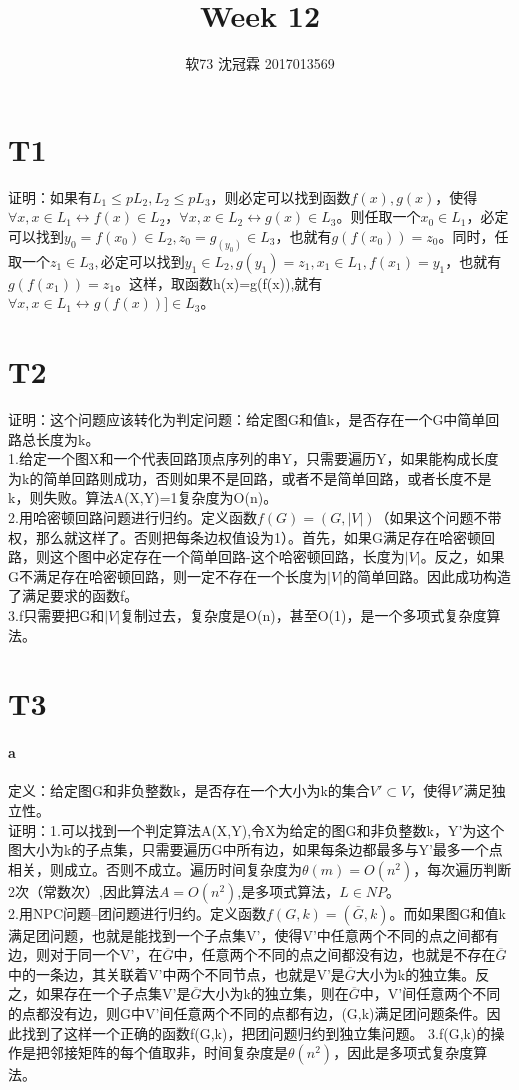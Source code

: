 \documentclass{article}
\title{Week 12}
\author{软73 沈冠霖 2017013569}
\begin{document}
\begin{CJK}{UTF8}{gkai}
\maketitle
\section{T1}
证明：如果有$L_{1}\leq pL_{2},L_{2}\leq pL_{3}$，则必定可以找到函数$f(x),g(x)$，使得$\forall x, x\in L_{1} \leftrightarrow f(x)\in L_{2}$，$\forall x, x\in L_{2} \leftrightarrow g(x)\in L_{3}$。则任取一个$x_{0}\in L_{1}$，必定可以找到$y_{0}=f(x_{0})\in L_{2},z_{0}=g_(y_{0})\in L_{3}$，也就有$g(f(x_{0}))=z_{0}$。同时，任取一个$z_{1}\in L_{3},$必定可以找到$y_{1}\in L_{2},g(y_{1})=z_{1},x_{1}\in L_{1},f(x_{1})=y_{1}$，也就有$g(f(x_{1}))=z_{1}$。这样，取函数h(x)=g(f(x)),就有$\forall x,x\in L_{1}\leftrightarrow g(f(x))]\in L_{3}$。

\section{T2}
证明：这个问题应该转化为判定问题：给定图G和值k，是否存在一个G中简单回路总长度为k。\\
1.给定一个图X和一个代表回路顶点序列的串Y，只需要遍历Y，如果能构成长度为k的简单回路则成功，否则如果不是回路，或者不是简单回路，或者长度不是k，则失败。算法A(X,Y)=1复杂度为O(n)。\\
2.用哈密顿回路问题进行归约。定义函数$f(G)=(G,|V|)$（如果这个问题不带权，那么就这样了。否则把每条边权值设为1）。首先，如果G满足存在哈密顿回路，则这个图中必定存在一个简单回路-这个哈密顿回路，长度为$|V|$。反之，如果G不满足存在哈密顿回路，则一定不存在一个长度为$|V|$的简单回路。因此成功构造了满足要求的函数f。\\
3.f只需要把G和$|V|$复制过去，复杂度是O(n)，甚至O(1)，是一个多项式复杂度算法。
\section{T3}
\paragraph{a}
定义：给定图G和非负整数k，是否存在一个大小为k的集合$V' \subset V$，使得$V'$满足独立性。\\
证明：1.可以找到一个判定算法A(X,Y),令X为给定的图G和非负整数k，Y'为这个图大小为k的子点集，只需要遍历G中所有边，如果每条边都最多与Y'最多一个点相关，则成立。否则不成立。遍历时间复杂度为$\theta(m)=O(n^{2})$，每次遍历判断2次（常数次）,因此算法$A=O(n^{2})$,是多项式算法，$L\in NP$。\\
2.用NPC问题--团问题进行归约。定义函数$f(G,k)=(\overline{G},k)$。而如果图G和值k满足团问题，也就是能找到一个子点集V'，使得V'中任意两个不同的点之间都有边，则对于同一个V'，在$\overline{G}$中，任意两个不同的点之间都没有边，也就是不存在$\overline{G}$中的一条边，其关联着V'中两个不同节点，也就是V'是$\overline{G}$大小为k的独立集。反之，如果存在一个子点集V'是$\overline{G}$大小为k的独立集，则在$\overline{G}$中，V'间任意两个不同的点都没有边，则G中V'间任意两个不同的点都有边，(G,k)满足团问题条件。因此找到了这样一个正确的函数f(G,k)，把团问题归约到独立集问题。
3.f(G,k)的操作是把邻接矩阵的每个值取非，时间复杂度是$\theta(n^{2})$，因此是多项式复杂度算法。

\end{CJK}
\end{document}
